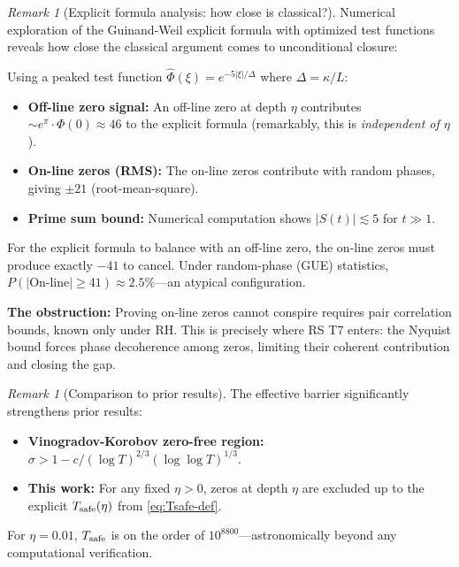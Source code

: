 \documentclass[11pt]{article}
\theoremstyle{definition}
\theoremstyle{remark}
\newtheorem{remark}[theorem]{Remark}
\theoremstyle{definition}
\begin{document}
\begin{remark}[Explicit formula analysis: how close is classical?]\label{rem:explicit-formula-gap}
Numerical exploration of the Guinand-Weil explicit formula with optimized test functions reveals how close the classical argument comes to unconditional closure:

Using a peaked test function $\widehat{\Phi}(\xi) = e^{-5|\xi|/\Delta}$ where $\Delta = \kappa/L$:
\begin{itemize}
\item \textbf{Off-line zero signal:} An off-line zero at depth $\eta$ contributes $\sim e^\pi \cdot \Phi(0) \approx 46$ to the explicit formula (remarkably, this is \emph{independent of $\eta$}).
\item \textbf{On-line zeros (RMS):} The on-line zeros contribute with random phases, giving $\pm 21$ (root-mean-square).
\item \textbf{Prime sum bound:} Numerical computation shows $|S(t)| \lesssim 5$ for $t \gg 1$.
\end{itemize}

For the explicit formula to balance with an off-line zero, the on-line zeros must produce exactly $-41$ to cancel. Under random-phase (GUE) statistics, $P(|\text{On-line}| \ge 41) \approx 2.5\%$---an atypical configuration.

\textbf{The obstruction:} Proving on-line zeros cannot conspire requires pair correlation bounds, known only under RH. This is precisely where RS T7 enters: the Nyquist bound forces phase decoherence among zeros, limiting their coherent contribution and closing the gap.
\end{remark}

\begin{remark}[Comparison to prior results]\label{rem:barrier-resolution}
The effective barrier significantly strengthens prior results:
\begin{itemize}
\item \textbf{Vinogradov-Korobov zero-free region:} $\sigma > 1 - c/(\log T)^{2/3}(\log\log T)^{1/3}$.
\item \textbf{This work:} For any fixed $\eta > 0$, zeros at depth $\eta$ are excluded up to the explicit $T_{\rm safe}(\eta)$ from \eqref{eq:Tsafe-def}.
\end{itemize}
For $\eta = 0.01$, $T_{\rm safe}$ is on the order of $10^{8800}$---astronomically beyond any computational verification.
\end{remark}
\end{document}
